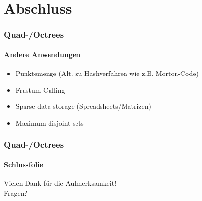 \documentclass{beamer}
\begin{document}
\section{Abschluss}

\begin{frame}
  \frametitle{Quad-/Octrees}
  \framesubtitle{Andere Anwendungen}
  \begin{itemize}
    \item Punktemenge (Alt. zu Hashverfahren wie z.B. Morton-Code)
    \item Frustum Culling
    \item Sparse data storage (Spreadsheets/Matrizen)
    \item Maximum disjoint sets
  \end{itemize}
\end{frame}

\begin{frame}
  \frametitle{Quad-/Octrees}
  \framesubtitle{Schlussfolie}
  \begin{center}
    Vielen Dank für die Aufmerksamkeit! \\
    \hfill\break
    Fragen?
  \end{center}
\end{frame}
\end{document}
